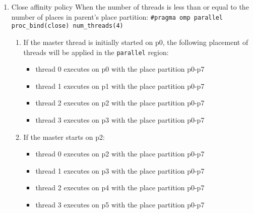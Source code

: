 \documentclass[11pt]{article}
\begin{document}
\begin{enumerate}
\item Close affinity policy
\label{sec-9-6-2-2}
When the number of threads is less than or equal to the number of places in parent's place partition:
\texttt{\#pragma omp parallel proc\_bind(close) num\_threads(4)}
\begin{enumerate}
\item If the master thread is initially started on p0, the following placement of threads will be applied in the \verb~parallel~ region:
\begin{itemize}
\item thread 0 executes on p0 with the place partition p0-p7
\item thread 1 executes on p1 with the place partition p0-p7
\item thread 2 executes on p2 with the place partition p0-p7
\item thread 3 executes on p3 with the place partition p0-p7
\end{itemize}
\item If the master starts on p2:
\begin{itemize}
\item thread 0 executes on p2 with the place partition p0-p7
\item thread 1 executes on p3 with the place partition p0-p7
\item thread 2 executes on p4 with the place partition p0-p7
\item thread 3 executes on p5 with the place partition p0-p7
\end{itemize}
\end{enumerate}


\end{enumerate}
\end{document}
